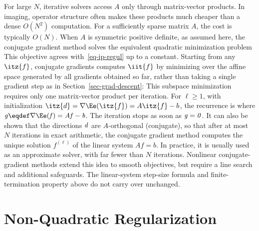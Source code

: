 For large $N$, iterative solvers access $A$ only through matrix-vector products. In imaging, operator structure often makes these products much cheaper than a dense $O(N^2)$ computation. For a sufficiently sparse matrix $A$, the cost is typically $O(N)$.
%
When $A$ is symmetric positive definite, as assumed here, the conjugate gradient method solves the equivalent quadratic minimization problem
This objective agrees with~\eqref{eq-ip-regul} up to a constant. Starting from any $\itz{f}$, conjugate gradients computes $\iit{f}$ by minimizing over the affine space generated by all gradients obtained so far, rather than taking a single gradient step as in Section~\ref{sec-grad-descent}:
This subspace minimization requires only one matrix-vector product per iteration. For $\ell\geq1$, with initialization $\itz{d} = \nabla \Ee(\itz{f}) = A\itz{f}-b$, the recurrence is
where $\it{g}\eqdef\nabla\Ee(\it{f})=A\it{f}-b$. The iteration stops as soon as $\it{g}=0$.
%
It can also be shown that the directions $\it{d}$ are $A$-orthogonal (conjugate), so that after at most $N$ iterations in exact arithmetic, the conjugate gradient method computes the unique solution $f^{(\ell)}$ of the linear system $A f = b$.  In practice, it is usually used as an approximate solver, with far fewer than $N$ iterations.
%
Nonlinear conjugate-gradient methods extend this idea to smooth objectives, but require a line search and additional safeguards. The linear-system step-size formula and finite-termination property above do not carry over unchanged.



\section{Non-Quadratic Regularization}

